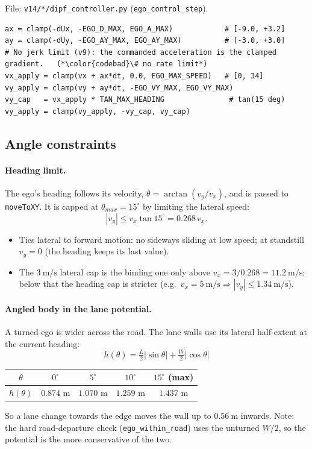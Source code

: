 \documentclass[11pt,a4paper]{article}
\begin{document}
File: \texttt{v14/*/dipf\_controller.py} (\texttt{ego\_control\_step}).
\begin{lstlisting}
ax = clamp(-dUx, -EGO_D_MAX, EGO_A_MAX)            # [-9.0, +3.2]
ay = clamp(-dUy, -EGO_AY_MAX, EGO_AY_MAX)          # [-3.0, +3.0]
# No jerk limit (v9): the commanded acceleration is the clamped gradient.   (*\color{codebad}\# no rate limit*)
vx_apply = clamp(vx + ax*dt, 0.0, EGO_MAX_SPEED)   # [0, 34]
vy_apply = clamp(vy + ay*dt, -EGO_VY_MAX, EGO_VY_MAX)
vy_cap   = vx_apply * TAN_MAX_HEADING               # tan(15 deg)
vy_apply = clamp(vy_apply, -vy_cap, vy_cap)
\end{lstlisting}

\subsection{Angle constraints}
\paragraph{Heading limit.} The ego's heading follows its velocity, $\theta = \arctan(v_y / v_x)$, and is passed to
\texttt{moveToXY}. It is capped at $\theta_{max} = 15^\circ$ by limiting the lateral speed:
\[
  |v_y| \le v_x \tan 15^\circ = 0.268\, v_x .
\]
\begin{itemize}
  \item Ties lateral to forward motion: no sideways sliding at low speed; at standstill $v_y = 0$
        (the heading keeps its last value).
  \item The $3~\mathrm{m/s}$ lateral cap is the binding one only above $v_x = 3/0.268 = 11.2~\mathrm{m/s}$;
        below that the heading cap is stricter (e.g.\ $v_x = 5~\mathrm{m/s} \Rightarrow |v_y| \le 1.34~\mathrm{m/s}$).
\end{itemize}

\paragraph{Angled body in the lane potential.} A turned ego is wider across the road. The lane walls use its
lateral half-extent at the current heading:
\[
  h(\theta) = \tfrac{L}{2}|\sin\theta| + \tfrac{W}{2}|\cos\theta|
\]
\begin{center}
\begin{tabular}{ccccc}
  \toprule
  $\theta$ & $0^\circ$ & $5^\circ$ & $10^\circ$ & $15^\circ$ (max) \\
  \midrule
  $h(\theta)$ & $0.874$ m & $1.070$ m & $1.259$ m & $1.437$ m \\
  \bottomrule
\end{tabular}
\end{center}
So a lane change towards the edge moves the wall up to $0.56~\mathrm{m}$ inwards. Note: the hard road-departure
check (\texttt{ego\_within\_road}) uses the unturned $W/2$, so the potential is the more conservative of the two.
\end{document}
